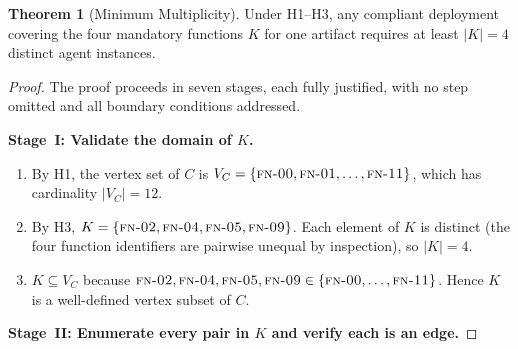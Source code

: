 \documentclass[12pt]{article}
\theoremstyle{definition}
\newtheorem{theorem}{Theorem}
\newcommand{\FN}[1]{\textsc{fn-#1}}
\begin{document}
\begin{theorem}[Minimum Multiplicity]
\label{thm:multiplicity}
Under H1--H3, any compliant deployment covering the four mandatory functions
$K$ for one artifact requires at least $|K| = 4$ distinct agent instances.
\end{theorem}

\begin{proof}
The proof proceeds in seven stages, each fully justified, with no step
omitted and all boundary conditions addressed.

\medskip
\noindent\textbf{Stage~I: Validate the domain of $K$.}
\begin{enumerate}
    \item[I.1] By H1, the vertex set of $C$ is
               $V_C = \{\FN{00},\FN{01},\ldots,\FN{11}\}$, which has
               cardinality $|V_C| = 12$.
    \item[I.2] By H3, $K = \{\FN{02},\FN{04},\FN{05},\FN{09}\}$.
               Each element of $K$ is distinct (the four function
               identifiers are pairwise unequal by inspection), so
               $|K| = 4$.
    \item[I.3] $K \subseteq V_C$ because $\FN{02}, \FN{04}, \FN{05},
               \FN{09} \in \{\FN{00},\ldots,\FN{11}\}$.
               Hence $K$ is a well-defined vertex subset of $C$.
\end{enumerate}

\medskip
\noindent\textbf{Stage~II: Enumerate every pair in $K$ and verify each
is an edge.}


\end{proof}
\end{document}
